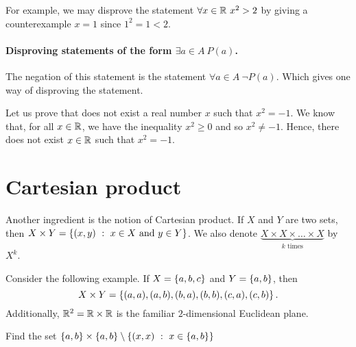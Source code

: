 For example, we may disprove the statement $\forall x \in \mathbb{R} \ x^2 > 2$ by
giving a counterexample $x = 1$ since $1^2 = 1 < 2$.

\paragraph{Disproving statements of the form $\exists a \in A \ P(a)$.}
The negation of this statement is the statement $\forall a \in A \ \lnot P(a)$.
Which gives one way of disproving the statement.

Let us prove that does not exist a real number $x$ such that $x^2 = -1$. We
know that, for all $x \in \mathbb{R}$, we have the inequality $x^2 \ge 0$ and so $x^2
\neq -1$. Hence, there does not exist $x \in \mathbb{R}$ such that $x^2 = -1$.

\section{Cartesian product}
Another ingredient is the notion of Cartesian product. If $X$ and $Y$ are two
sets, then $X \times Y = \set[x \in X \text{ and } y \in Y]{(x, y)}$. We also
denote $\underbrace{X \times X \times \dots \times X}_{k \text{ times}}$ by
$X^k$.

Consider the following example. If $X = \set{a, b, c}$ and $Y = \set{a, b}$,
then $$X \times Y = \set{(a, a), (a, b), (b, a), (b, b), (c, a), (c, b)}.$$
Additionally, $\mathbb{R}^2 = \mathbb{R} \times \mathbb{R}$ is the familiar $2$-dimensional Euclidean
plane.

\begin{exercise}
  Find the set $\set{a, b} \times \set{a, b} \setminus
  \set[x \in \set{a, b}]{(x, x)}$
\end{exercise}

